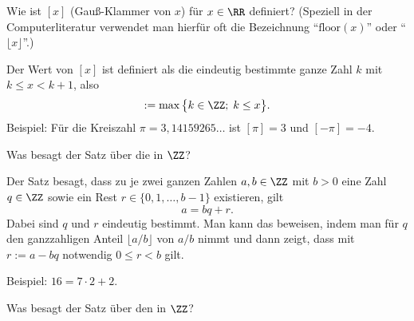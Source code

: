 \begin{frage}\label{01_gkl}
  Wie ist $[ x ]$ 
  (Gauß-Klammer von $x$) für $x\in \RR$ definiert? (Speziell in der 
  Computerliteratur verwendet man hierfür oft die Bezeichnung 
  "`$\mathrm{floor}(x)$"' oder "`$\lfloor x \rfloor$"'.)
\end{frage}

\begin{antwort}
  Der Wert von $[x]$ 
  ist definiert als die eindeutig bestimmte ganze Zahl $k$ 
  mit $k\le x <k+1$, also
  \begin{equation}
    [ x ] := \max \big\{ k\in\ZZ;\; k\le x \big\}. \notag
  \end{equation}
  \noindent
  Beispiel: Für die Kreiszahl $\pi=3,14159265\ldots$ ist 
  $[ \pi ]=3$ und $[ -\pi ]=-4$. \AntEnd
\end{antwort}






\begin{frage}
  Was besagt der Satz über die  in $\ZZ$?
\end{frage}

\begin{antwort}
  Der Satz besagt, dass zu je zwei ganzen Zahlen $a,b \in \ZZ$ 
  mit $b>0$ 
  eine Zahl $q\in \ZZ$ sowie ein Rest 
  $r \in \{ 0, 1, \ldots ,b-1 \}$ 
  existieren, {\sd} gilt 
  \[
  a=bq+r.  
  \]
  Dabei sind $q$ und $r$ eindeutig bestimmt. 
  Man kann das beweisen, indem man für $q$ den ganzzahligen Anteil 
  $\lfloor a/b \rfloor$ von $a/b$ nimmt und dann zeigt, 
  dass mit $r:=a-bq$ notwendig $0 \le r < b$ gilt.

  Beispiel: $16=7\cdot 2 + 2$.
  \AntEnd
\end{antwort}






\begin{frage}
  Was besagt der Satz über den 
   in $\ZZ$?
\end{frage}  

